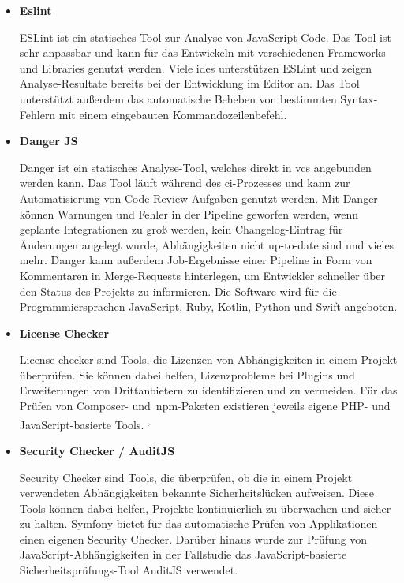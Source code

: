 \begin{itemize}
    \item {
        \textbf{Eslint}\par
        ESLint ist ein statisches Tool zur Analyse von JavaScript-Code.
        Das Tool ist sehr anpassbar und kann für das Entwickeln mit verschiedenen Frameworks und Libraries genutzt
        werden.
        Viele \acrshort{ide}s unterstützen ESLint und zeigen Analyse-Resultate bereits bei der Entwicklung im Editor
        an.
        Das Tool unterstützt außerdem das automatische Beheben von bestimmten Syntax-Fehlern mit einem eingebauten
        Kommandozeilenbefehl.
    }

    \item {
        \textbf{Danger JS}\par
        Danger ist ein statisches Analyse-Tool, welches direkt in \acrshort{vcs} angebunden werden kann.
        Das Tool läuft während des \acrshort{ci}-Prozesses und kann zur Automatisierung von Code-Review-Aufgaben
        genutzt werden.
        Mit Danger können Warnungen und Fehler in der Pipeline geworfen werden, wenn geplante Integrationen zu
        groß werden, kein Changelog-Eintrag für Änderungen angelegt wurde, Abhängigkeiten nicht up-to-date sind und
        vieles mehr.
        Danger kann außerdem Job-Ergebnisse einer Pipeline in Form von Kommentaren in Merge-Requests hinterlegen,
        um Entwickler schneller über den Status des Projekts zu informieren.
        Die Software wird für die Programmiersprachen JavaScript, Ruby, Kotlin, Python und Swift angeboten.
    }

    \item {
        \textbf{License Checker}\par
        License checker sind Tools, die Lizenzen von Abhängigkeiten in einem Projekt überprüfen.
        Sie können dabei helfen, Lizenzprobleme bei Plugins und Erweiterungen von Drittanbietern zu identifizieren
        und zu vermeiden.
        Für das Prüfen von Composer- und\ \acrshort{npm}-Paketen existieren jeweils eigene PHP- und JavaScript-basierte
        Tools.
        \textsuperscript{,\ }
    }

    \item {
        \textbf{Security Checker / AuditJS}\par
        Security Checker sind Tools, die überprüfen, ob die in einem Projekt verwendeten Abhängigkeiten bekannte
        Sicherheitslücken aufweisen.
        Diese Tools können dabei helfen, Projekte kontinuierlich zu überwachen und sicher zu halten.
        Symfony bietet für das automatische Prüfen von Applikationen einen eigenen Security Checker.
        Darüber hinaus wurde zur Prüfung von JavaScript-Abhängigkeiten in der Fallstudie das JavaScript-basierte
        Sicherheitsprüfungs-Tool AuditJS verwendet.
    }
\end{itemize}

